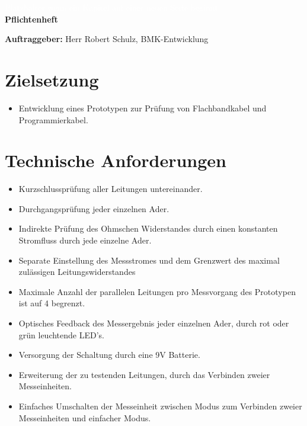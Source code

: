 \documentclass[a4paper,11pt]{scrartcl}
\begin{document}
\begin{center}
	\begin{huge}
	\textcolor{white}{\tiny{Platzhalter wenn ein Kapitel auf einer neuen Seite beginnt\\}}
	\textbf{Pflichtenheft}
	\end{huge}
\end{center}


\textbf{Auftraggeber:}
Herr Robert Schulz, BMK-Entwicklung

\section{Zielsetzung}

\begin{itemize}
	\item{Entwicklung eines Prototypen zur Prüfung von Flachbandkabel und Programmierkabel.}
\end{itemize}

\section{Technische Anforderungen}

\begin{itemize}
	\item{Kurzschlussprüfung aller Leitungen untereinander.}
	
	\item{Durchgangsprüfung jeder einzelnen Ader.}
	
	\item{Indirekte Prüfung des Ohmschen Widerstandes durch einen konstanten Stromfluss durch jede einzelne Ader.}
	
	\item{Separate Einstellung des Messstromes und dem Grenzwert des maximal zulässigen Leitungswiderstandes}
	
	\item{Maximale Anzahl der parallelen Leitungen pro Messvorgang des Prototypen ist auf 4 begrenzt.}
	
	\item{Optisches Feedback des Messergebnis jeder einzelnen Ader, durch rot oder grün leuchtende LED's.}
	
	\item{Versorgung der Schaltung durch eine 9V Batterie.}
	
	\item{Erweiterung der zu testenden Leitungen, durch das Verbinden zweier Messeinheiten.}
	
	\item{Einfaches Umschalten der Messeinheit zwischen Modus zum Verbinden zweier Messeinheiten und einfacher Modus.}
\end{itemize}
\end{document}
